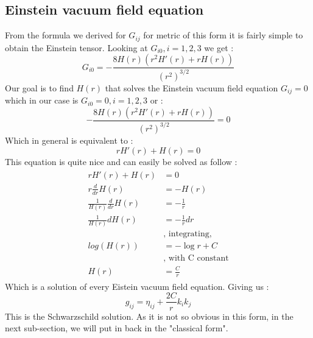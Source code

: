 \documentclass[a4paper,12pt]{article}
\theoremstyle{definition}
\begin{document}
\subsection{Einstein vacuum field equation}
From the formula we derived for $G_{ij}$ for metric of this form it is fairly simple to obtain the Einstein tensor.
Looking at $G_{i0}, i=1,2,3$ we get :
\begin{equation}
	G_{i0}=-\frac{8 H(r) (r^2 H'(r)+rH(r))}{(r^2)^{3/2}}
\end{equation}
Our goal is to find $H(r)$ that solves the Einstein vacuum field equation $G_{ij}=0$ which in our case is $G_{i0}=0, i=1,2,3$ or :
\begin{equation}
	-\frac{8 H(r) (r^2 H'(r)+rH(r))}{(r^2)^{3/2}}=0
\end{equation}
Which in general is equivalent to :
\begin{equation}
	rH'(r)+H(r)=0
\end{equation}
This equation is quite nice and can easily be solved as follow :
\begin{align}
\begin{split}
	rH'(r)+H(r)&=0\\
	r\frac{d}{dr}H(r)&=-H(r)\\
	\frac{1}{H(r)}\frac{d}{dr}H(r)&=-\frac{1}{r}\\
	\frac{1}{H(r)}dH(r)&=-\frac{1}{r}dr \;\\
	&\text{, integrating,}\\
	log(H(r))&=-\log{r}+C \;\\
	&\text{, with C constant}\\
	H(r)&=\frac{C}{r}
\end{split}
\end{align}
Which is a solution of every Eistein vacuum field equation. Giving us :
\begin{equation}
	g_{ij}=\eta_{ij}+\frac{2C}{r}k_ik_j
\end{equation}
This is the Schwarzschild solution. As it is not so obvious in this form, in the next sub-section, we will put in back in the "classical form".
\end{document}

